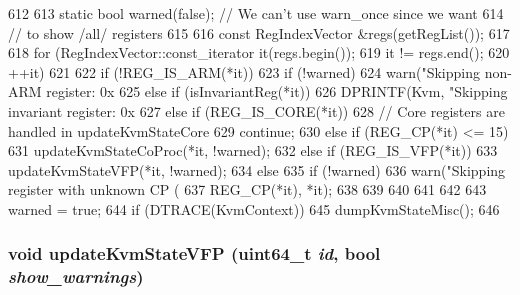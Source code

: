 \begin{DoxyCode}
612 {
613     static bool warned(false); // We can't use warn_once since we want
614                                // to show /all/ registers
615 
616     const RegIndexVector &regs(getRegList());
617 
618     for (RegIndexVector::const_iterator it(regs.begin());
619          it != regs.end();
620          ++it) {
621 
622         if (!REG_IS_ARM(*it)) {
623             if (!warned)
624                 warn("Skipping non-ARM register: 0x%
625         } else if (isInvariantReg(*it)) {
626             DPRINTF(Kvm, "Skipping invariant register: 0x%
627         } else if (REG_IS_CORE(*it)) {
628             // Core registers are handled in updateKvmStateCore
629             continue;
630         } else if (REG_CP(*it) <= 15) {
631             updateKvmStateCoProc(*it, !warned);
632         } else if (REG_IS_VFP(*it)) {
633             updateKvmStateVFP(*it, !warned);
634         } else {
635             if (!warned) {
636                 warn("Skipping register with unknown CP (%
637                      REG_CP(*it), *it);
638             }
639         }
640 
641     }
642 
643     warned = true;
644     if (DTRACE(KvmContext))
645         dumpKvmStateMisc();
646 }
\end{DoxyCode}
\hypertarget{classArmKvmCPU_ad423a1f901d535a33ee19130f1892350}{
\subsubsection[{updateKvmStateVFP}]{\setlength{\rightskip}{0pt plus 5cm}void updateKvmStateVFP (uint64\_\-t {\em id}, \/  bool {\em show\_\-warnings})}}
\label{classArmKvmCPU_ad423a1f901d535a33ee19130f1892350}



